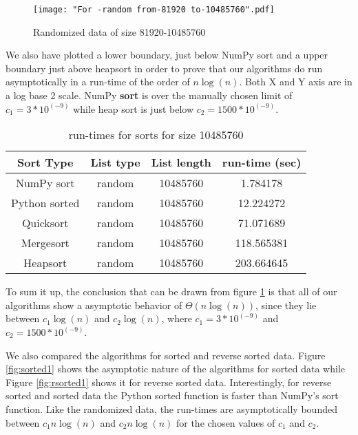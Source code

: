 \documentclass[sigconf, nonacm, natbib, screen, balance=False]{acmart}
\begin{document}
\begin{figure}[ht]
\texttt{[image: "For -random from-81920 to-10485760".pdf]}
    \caption{Randomized data of size 81920-10485760}
    \label{fig:random2}
\end{figure}


We also have plotted a lower boundary, just below NumPy sort and a upper boundary just above heapsort in order to prove that our algorithms do run asymptotically in a run-time of the order of \textbf{$n\log \left(n\right)$}. Both X and Y axis are in a log base 2 scale. NumPy \textbf{sort} is over the manually chosen limit of \textbf{$c_1=3 * 10^(-9)$} while heap sort is just below \textbf{$c_2= 1500  * 10^(-9)$}.

\begin{table}[ht]
\caption{run-times for sorts for size 10485760}
\label{tab:table1}
\begin{center}
\begin{tabular}{|c|c|c|c|} 
\hline
Sort Type & List type & List length & run-time (sec) \\
\hline
NumPy sort &	random &	10485760 &	1.784178 \\
Python sorted &	random &	10485760 &	12.224272 \\
Quicksort &	random &	10485760 &	71.071689 \\
Mergesort &	random &	10485760 &	118.565381 \\
Heapsort &	random &	10485760 &	203.664645 \\
\hline
\end{tabular}
\end{center}
\end{table}

To sum it up, the conclusion that can be drawn from figure \ref{fig:random2} is that all of our algorithms show a asymptotic behavior of $\Theta \left(n \log\left(n\right)\right)$, since they lie between $c_1 \log\left(n\right)$ and $c_2 \log\left(n\right)$, where $c_1=3 * 10^(-9)$ and $c_2= 1500  * 10^(-9)$. \newline

We also compared the algorithms for sorted and reverse sorted data. Figure \ref{fig:sorted1} shows the asymptotic nature of the algorithms for sorted data while Figure \ref{fig:rsorted1} shows it for reverse sorted data. \newline
Interestingly, for reverse sorted and sorted data the Python sorted function is faster than NumPy's sort function. Like the randomized data, the run-times are asymptotically bounded between $c_1 n \log\left(n\right)$  and $c_2 n \log\left(n\right)$ for the chosen values of $c_1$ and $c_2$.\newline
\end{document}
